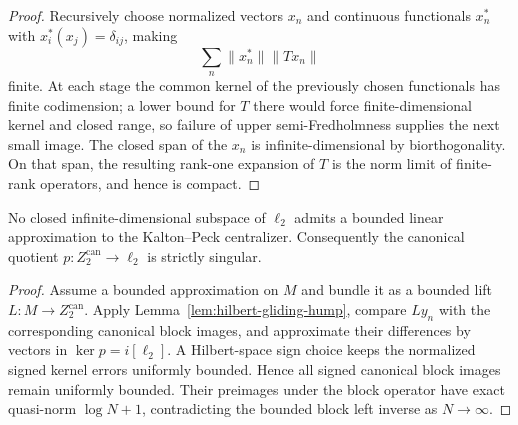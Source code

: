 \begin{proof}
Recursively choose normalized vectors $x_n$ and continuous functionals $x_n^*$ with
$x_i^*(x_j)=\delta_{ij}$, making
\[
  \sum_n \lVert x_n^*\rVert\lVert Tx_n\rVert
\]
finite.  At each stage the common kernel of the previously chosen functionals has finite
codimension; a lower bound for $T$ there would force finite-dimensional kernel and closed range,
so failure of upper semi-Fredholmness supplies the next small image.  The closed span of the
$x_n$ is infinite-dimensional by biorthogonality.  On that span, the resulting rank-one
expansion of $T$ is the norm limit of finite-rank operators, and hence is compact.
\end{proof}

\begin{theorem}
\label{thm:canonical-centralizer-obstruction}
No closed infinite-dimensional subspace of $\ell_2$ admits a bounded linear approximation to the
Kalton--Peck centralizer.  Consequently the canonical quotient
$p:Z_2^{\mathrm{can}}\to\ell_2$ is strictly singular.
\leanok
\end{theorem}

\begin{proof}
Assume a bounded approximation on $M$ and bundle it as a bounded lift $L:M\to Z_2^{\mathrm{can}}$.
Apply Lemma~\ref{lem:hilbert-gliding-hump}, compare $Ly_n$ with the corresponding canonical block
images, and approximate their differences by vectors in $\ker p=i[\ell_2]$.  A Hilbert-space
sign choice keeps the normalized signed kernel errors uniformly bounded.  Hence all signed
canonical block images remain uniformly bounded.  Their preimages under the block operator have
exact quasi-norm $\log N+1$, contradicting the bounded block left inverse as $N\to\infty$.
\end{proof}

